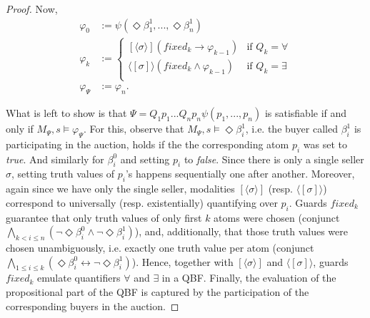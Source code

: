 \begin{proof}
    Now,
    \begin{align*}
    \varphi_0 &:= \psi(\Diamond \beta^1_1, ..., \Diamond \beta^1_n)\\
\varphi_k &:= 
\begin{cases} 
	[\! \langle \sigma \rangle \!] (fixed_k \to \varphi_{k-1}) &\text{if } Q_k = \forall\\
	\langle \! [ \sigma ] \! \rangle (fixed_k \land \varphi_{k-1}) &\text{if } Q_k = \exists\\
\end{cases}\\
\varphi_\Psi &:= \varphi_{n}.
\end{align*}

What is left to show is that $\Psi = Q_1 p_1 ... Q_n p_n \psi(p_1,...,p_n)$ is satisfiable if and only if $M_\Psi, s \models \varphi_\Psi$. For this, observe that $M_\Psi, s \models \Diamond \beta_i^1$, i.e. the buyer called $\beta^1_i$ is participating in the auction, holds if the the corresponding atom $p_i$ was set to \textit{true}. And similarly for $\beta_i^0$ and setting $p_i$ to \textit{false}. Since there is only a single seller $\sigma$, setting truth values of $p_i$'s happens sequentially one after another. Moreover, again since we have only the single seller, modalities $[\! \langle \sigma \rangle \!]$ (resp. $\langle \! [ \sigma ] \! \rangle$) correspond to universally (resp. existentially) quantifying over $p_i$. Guards $fixed_k$ guarantee that only truth values of only first $k$ atoms were chosen (conjunct $\bigwedge_{k < i \leqslant n} (\lnot \Diamond \beta^0_i \land \lnot \Diamond \beta^1_i)$), and, additionally, that those truth values were chosen unambiguously, i.e. exactly one truth value per atom (conjunct $\bigwedge_{1 \leqslant i \leqslant k} (\Diamond \beta_i^0 \leftrightarrow \lnot \Diamond \beta_i^1)$). Hence, together with $[\! \langle \sigma \rangle \!]$ and $\langle \! [ \sigma ] \! \rangle$, guards $fixed_k$ emulate quantifiers $\forall$ and $\exists$ in a QBF. Finally, the evaluation of the propositional part of the QBF is captured by the participation of the corresponding buyers in the auction. 
\end{proof}


\clearpage